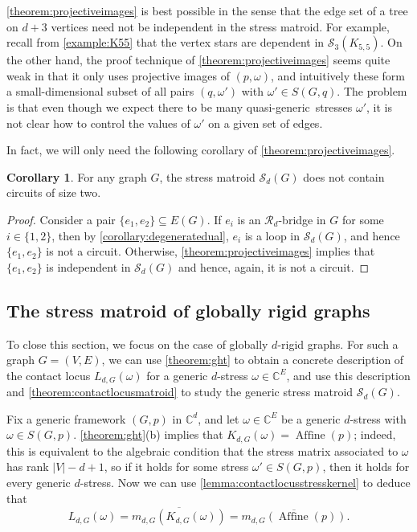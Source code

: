 \documentclass[11pt,a4paper,dvipsnames]{scrartcl}
\theoremstyle{definition}
\newtheorem{corollary}[theorem]{Corollary}
\newcommand{\CC}{\mathbb{C}}
\newcommand{\stressmatroid}[2]{\mathcal{S}_{#1}(#2)}
\newcommand{\stresskernel}[2]{K_{{#1},{#2}}}
\newcommand{\contactlocus}[2]{L_{#1,#2}}
\DeclareMathOperator{\aff}{Affine}
\newcommand{\affine}[2]{\aff(#2)}
\newcommand{\quasigen}{quasi-generic}
\begin{document}
\cref{theorem:projectiveimages} is best possible in the sense that the edge set of a tree on $d+3$ vertices need not be independent in the stress matroid. For example, recall from \cref{example:K55} that the vertex stars are dependent in $\mathcal{S}_3(K_{5,5})$.  On the other hand, the proof technique of \cref{theorem:projectiveimages} seems quite weak in that it only uses projective images of $(p,\omega)$, and intuitively these form a small-dimensional subset of all pairs $(q,\omega')$ with $\omega' \in S(G,q)$. The problem is that even though we expect there to be many \quasigen\ stresses $\omega'$, it is not clear how to control the values of $\omega'$ on a given set of edges. 

In fact, we will only need the following corollary of \cref{theorem:projectiveimages}.

\begin{corollary}\label{theorem:stressindependence}
    For any graph $G$, the stress matroid $\stressmatroid{d}{G}$ does not contain circuits of size two.
\end{corollary}
\begin{proof}
    Consider a pair $\{e_1,e_2\} \subseteq E(G)$. 
    If $e_i$ is an $\mathcal{R}_d$-bridge in $G$ for some $i \in \{1,2\}$, then by \cref{corollary:degeneratedual}, $e_i$ is a loop in $\stressmatroid{d}{G}$, and hence $\{e_1,e_2\}$ is not a circuit. Otherwise, \cref{theorem:projectiveimages} implies that $\{e_1,e_2\}$ is independent in $\stressmatroid{d}{G}$ and hence, again, it is not a circuit.
\end{proof}



\subsection{The stress matroid of globally rigid graphs}\label{subsection:globallyrigidstressmatroid}


To close this section, we focus on the case of globally $d$-rigid graphs. For such a graph $G = (V,E)$, we can use \cref{theorem:ght} to obtain a concrete description of the contact locus $\contactlocus{d}{G}(\omega)$ for a generic $d$-stress $\omega \in \CC^E$, and use this description and \cref{theorem:contactlocusmatroid} to study the generic stress matroid $\stressmatroid{d}{G}$.

Fix a generic framework $(G,p)$ in $\CC^d$, and let $\omega \in \CC^E$ be a generic $d$-stress with $\omega \in S(G,p)$. \cref{theorem:ght}(b) implies that $\stresskernel{d}{G}(\omega) = \affine{G}{p}$; indeed, this is equivalent to the algebraic condition that the stress matrix associated to $\omega$ has rank $|V|-d+1$, so if it holds for some stress $\omega' \in S(G,p)$, then it holds for every generic $d$-stress. Now we can use \cref{lemma:contactlocusstresskernel} to deduce that
\begin{equation}\label{eq:globallyrigidcontactlocus}
    \contactlocus{d}{G}(\omega) = \overline{m_{d,G}(\stresskernel{d}{G}(\omega))} = \overline{m_{d,G}(\affine{G}{p})}.
\end{equation}
\end{document}
